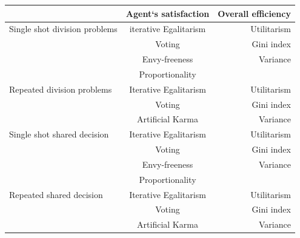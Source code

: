 \documentclass[german, a4paper, 11pt, oneside]{scrbook}
\begin{document}
\begin{tabular}[h]{l|c|r}
 & Agent`s satisfaction & Overall efficiency \\
\hline
Single shot division problems & iterative Egalitarism & Utilitarism \\
 & Voting & Gini index \\
 & Envy-freeness & Variance \\
 & Proportionality \\
\hline
Repeated division problems & Iterative Egalitarism & Utilitarism \\
 & Voting & Gini index \\
 & Artificial Karma & Variance \\
\hline
Single shot shared decision & Iterative Egalitarism & Utilitarism \\
 & Voting & Gini index \\
 & Envy-freeness & Variance \\
 & Proportionality & \\
\hline
Repeated shared decision & Iterative Egalitarism & Utilitarism \\
 & Voting & Gini index \\
 & Artificial Karma & Variance \\
\end{tabular}
\end{document}
